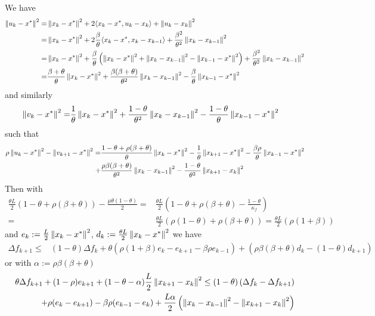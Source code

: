 \documentclass[english,12pt,a4paper]{article}
\begin{document}
We have
%
\begin{align*}
\left\|u_k -x^*\right\|^2 =& \left\|x_k -x^*\right\|^2 + 2\langle x_k-x^*,u_k-x_{k}\rangle + \left\|u_k-x_{k}\right\|^2\\
 =& \left\|x_k -x^*\right\|^2 + 2\frac{\beta}{\theta}\langle x_k-x^*,x_k-x_{k-1}\rangle + \frac{\beta^2}{\theta^2}\left\|x_k-x_{k-1}\right\|^2\\
=& \left\|x_k -x^*\right\|^2 + \frac{\beta}{\theta}\left( \left\|x_k-x^*\right\|^2 + \left\|x_k-x_{k-1}\right\|^2 -\left\|x_{k-1}-x^*\right\|^2\right)+ \frac{\beta^2}{\theta^2}\left\|x_k-x_{k-1}\right\|^2\\
=& \frac{\beta+\theta}{\theta}\left\|x_k -x^*\right\|^2  + \frac{\beta(\beta+\theta)}{\theta^2}\left\|x_k-x_{k-1}\right\|^2 - \frac{\beta}{\theta}\left\|x_{k-1}-x^*\right\|^2
\end{align*}
%
and similarly
%
\begin{align*}
\left\|v_k -x^*\right\|^2 =& \frac{1}{\theta}\left\|x_k -x^*\right\|^2  + \frac{1-\theta}{\theta^2}\left\|x_k-x_{k-1}\right\|^2 - \frac{1-\theta}{\theta}\left\|x_{k-1}-x^*\right\|^2
\end{align*}
%
such that
%
\begin{align*}
\rho\left\|u_k -x^*\right\|^2 - \left\|v_{k+1} -x^*\right\|^2 =& \frac{1-\theta+\rho(\beta+\theta)}{\theta}\left\|x_k -x^*\right\|^2-\frac{1}{\theta}\left\|x_{k+1} -x^*\right\|^2 - \frac{\beta\rho}{\theta}\left\|x_{k-1}-x^*\right\|^2\\
+& \frac{\rho\beta(\beta+\theta)}{\theta^2}\left\|x_k-x_{k-1}\right\|^2-\frac{1-\theta}{\theta^2}\left\|x_{k+1}-x_{k}\right\|^2
\end{align*}
%
Then with 
%
\begin{align*}
\frac{\theta L}{2} \left(1-\theta+\rho(\beta+\theta)\right) - \frac{\mu\theta(1-\theta)}{2}
=& \frac{\theta L}{2} \left(1-\theta+\rho(\beta+\theta) - \frac{1-\theta}{\kappa_f}\right)\\
=& \frac{\theta L}{2} \left(\rho(1-\theta)+\rho(\beta+\theta)\right)
= \frac{\theta L}{2} \left(\rho(1+\beta)\right)
\end{align*}
%
and $e_k:=\frac{ L}{2}\left\|x_k -x^*\right\|^2$, $d_k:=\frac{\theta L}{2}\left\|x_k -x^*\right\|^2$ we have
%
\begin{align*}
\Delta f_{k+1} \le& (1-\theta) \Delta f_k  + \theta\left( \rho(1+\beta)e_k-e_{k+1} - \beta\rho e_{k-1}\right)+\left( \rho\beta(\beta+\theta)d_k-(1-\theta)d_{k+1}\right)
\end{align*}
%
or with $\alpha:=\rho\beta(\beta+\theta)$
%
\begin{align*}
\theta \Delta f_{k+1} +(1-\rho)e_{k+1}  + (1-\theta-\alpha)\frac{ L}{2} \left\|x_{k+1}-x_{k}\right\|^2\le (1-\theta) \left( \Delta f_k- \Delta f_{k+1}\right)\\
+ \rho(e_k-e_{k+1}) -\beta\rho(e_{k-1}-e_k) + \frac{ L\alpha}{2}\left( \left\|x_k-x_{k-1}\right\|^2-\left\|x_{k+1}-x_{k}\right\|^2\right)
\end{align*}
\end{document}
